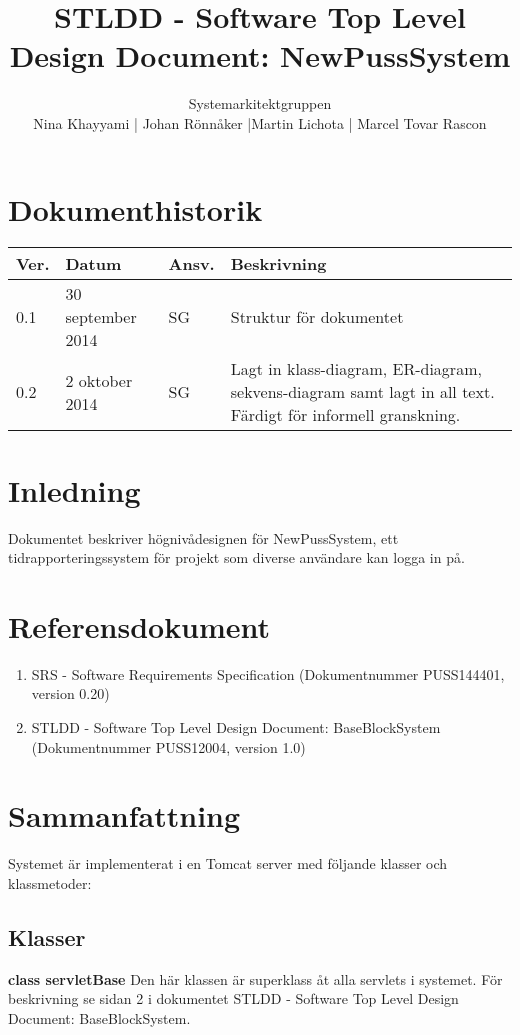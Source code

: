\documentclass[a4paper]{article}
\title{STLDD - Software Top Level Design Document: NewPussSystem}
\author{Systemarkitektgruppen \\ Nina Khayyami | Johan Rönnåker |Martin Lichota | Marcel Tovar Rascon}
\date{}
\begin{document}
\maketitle
\thispagestyle{fancy}
\tableofcontents
\newpage

\section*{Dokumenthistorik}

\begin{tabular}{ l l l p{8.5cm} }
Ver. & Datum & Ansv. & Beskrivning \\\hline
0.1 & 30 september 2014 & SG & Struktur för dokumentet\\
0.2 & 2 oktober 2014 & SG & Lagt in klass-diagram, ER-diagram, sekvens-diagram samt lagt in all text. Färdigt för informell granskning.



\end{tabular}
\newpage
\section{Inledning}       
Dokumentet beskriver högnivådesignen för NewPussSystem, ett tidrapporteringssystem för projekt som diverse användare kan logga in på.



\section{Referensdokument}
\begin{enumerate}
\item SRS - Software Requirements Specification (Dokumentnummer PUSS144401, version 0.20)
\item STLDD - Software Top Level Design Document: BaseBlockSystem (Dokumentnummer PUSS12004, version 1.0)
\end{enumerate}



\section{Sammanfattning}
Systemet är implementerat i en Tomcat server med följande klasser och klassmetoder:

\subsection{Klasser}
\begin{hangparas}{1.5em}{1}
\textbf{class servletBase} Den här klassen är superklass åt alla servlets i systemet. För beskrivning se sidan 2 i dokumentet STLDD - Software Top Level Design Document: BaseBlockSystem.\end{hangparas} 
\end{document}
